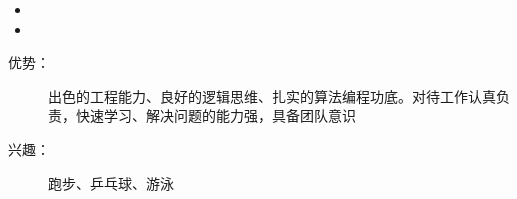  \begin{itemize}[leftmargin=*]
    \item
    \item
  \end{itemize}

  \begin{description}
    \item[优势：]出色的工程能力、良好的逻辑思维、扎实的算法编程功底。对待工作认真负责，快速学习、解决问题的能力强，具备团队意识
    \item[兴趣：]跑步、乒乓球、游泳
  \end{description}
